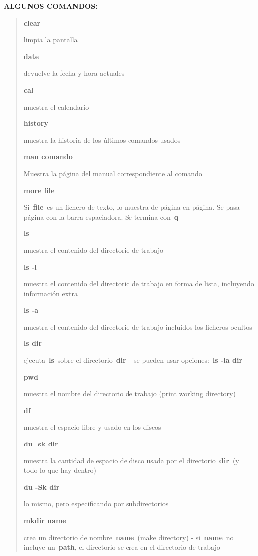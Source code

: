 \documentclass[
  letterpaper,
]{article}
\begin{document}
\textbf{ALGUNOS COMANDOS:}

\begin{quote}
\textbf{clear}

limpia la pantalla

\textbf{date}

devuelve la fecha y hora actuales

\textbf{cal}

muestra el calendario

\textbf{history}

muestra la historia de los últimos comandos usados

\textbf{man comando}

Muestra la página del manual correspondiente al comando

\textbf{more file}

Si~\textbf{file}~es un fichero de texto, lo muestra de página en página.
Se pasa página con la barra espaciadora. Se termina con~\textbf{q}

\textbf{ls}

muestra el contenido del directorio de trabajo

\textbf{ls -l}

muestra el contenido del directorio de trabajo en forma de lista,
incluyendo información extra

\textbf{ls -a}

muestra el contenido del directorio de trabajo incluídos los ficheros
ocultos

\textbf{ls dir}

ejecuta~\textbf{ls}~sobre el directorio~\textbf{dir}~- se pueden usar
opciones:~\textbf{ls -la dir}

\textbf{pwd}

muestra el nombre del directorio de trabajo (print working directory)

\textbf{df}

muestra el espacio libre y usado en los discos

\textbf{du -sk dir}

muestra la cantidad de espacio de disco usada por el
directorio~\textbf{dir}~(y todo lo que hay dentro)

\textbf{du -Sk dir}

lo mismo, pero especificando por subdirectorios

\textbf{mkdir name}

crea un directorio de nombre~\textbf{name}~(make directory) -
si~\textbf{name}~no incluye un~\textbf{path}, el directorio se crea en
el directorio de trabajo


\end{quote}
\end{document}
